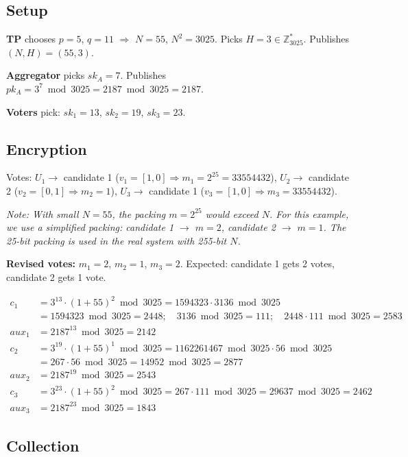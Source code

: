 \documentclass[11pt, a4paper]{article}
\begin{document}
\subsection{Setup}

\textbf{TP} chooses $p = 5$, $q = 11$ $\Rightarrow$ $N = 55$, $N^2 = 3025$. Picks $H = 3 \in \mathbb{Z}_{3025}^*$. Publishes $(N, H) = (55, 3)$.

\textbf{Aggregator} picks $sk_A = 7$. Publishes $pk_A = 3^7 \bmod 3025 = 2187 \bmod 3025 = 2187$.

\textbf{Voters} pick: $sk_1 = 13$, $sk_2 = 19$, $sk_3 = 23$.

\subsection{Encryption}

Votes: $U_1 \to$ candidate 1 ($v_1 = [1,0] \Rightarrow m_1 = 2^{25} = 33554432$), $U_2 \to$ candidate 2 ($v_2 = [0,1] \Rightarrow m_2 = 1$), $U_3 \to$ candidate 1 ($v_3 = [1,0] \Rightarrow m_3 = 33554432$).

\textit{Note: With small $N=55$, the packing $m = 2^{25}$ would exceed $N$. For this example, we use a simplified packing: candidate 1 $\to$ $m=2$, candidate 2 $\to$ $m=1$. The 25-bit packing is used in the real system with 255-bit $N$.}

\textbf{Revised votes:} $m_1 = 2$, $m_2 = 1$, $m_3 = 2$. Expected: candidate 1 gets 2 votes, candidate 2 gets 1 vote.

\begin{align*}
c_1 &= 3^{13} \cdot (1+55)^2 \bmod 3025 = 1594323 \cdot 3136 \bmod 3025 \\
    &= 1594323 \bmod 3025 = 2448; \quad 3136 \bmod 3025 = 111; \quad 2448 \cdot 111 \bmod 3025 = 2583 \\
aux_1 &= 2187^{13} \bmod 3025 = 2142 \\[4pt]
c_2 &= 3^{19} \cdot (1+55)^1 \bmod 3025 = 1162261467 \bmod 3025 \cdot 56 \bmod 3025 \\
    &= 267 \cdot 56 \bmod 3025 = 14952 \bmod 3025 = 2877 \\
aux_2 &= 2187^{19} \bmod 3025 = 2543 \\[4pt]
c_3 &= 3^{23} \cdot (1+55)^2 \bmod 3025 = 267 \cdot 111 \bmod 3025 = 29637 \bmod 3025 = 2462 \\
aux_3 &= 2187^{23} \bmod 3025 = 1843
\end{align*}

\subsection{Collection}
\end{document}
